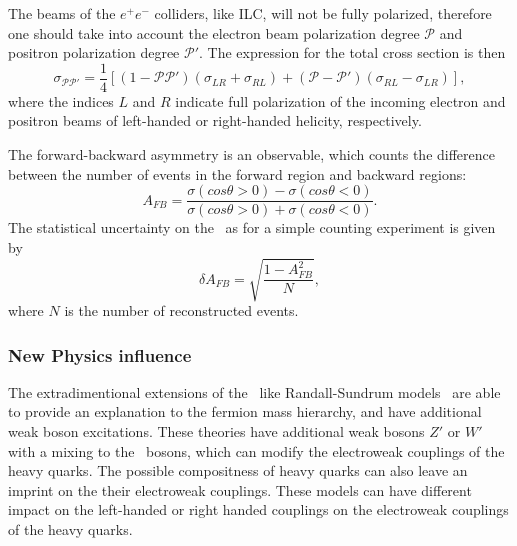The beams of the $e^+e^-$ colliders, like ILC, will not be fully polarized, therefore one should take into account the electron beam polarization degree $\mathcal{P}$ and positron polarization degree $\mathcal{P}'$. 
The expression for the total cross section is then
\begin{equation}
\label{formula:RealSigma_3}
\sigma_{\mathcal{P}\mathcal{P}'} = \frac{1}{4}[(1-\mathcal{P}\mathcal{P}')(\sigma_{LR}+\sigma_{RL} ) + (\mathcal{P} - \mathcal{P}')(\sigma_{RL} - \sigma_{LR})],
\end{equation}
where the indices $L$ and $R$ indicate full polarization of the incoming electron and positron beams of left-handed or right-handed helicity, respectively.

The forward-backward asymmetry is an observable, which counts the difference between the number of events in the forward region and backward regions:
\begin{equation}
A_{FB} = \frac{\sigma(cos\theta > 0) - \sigma(cos\theta < 0)}{\sigma(cos\theta > 0) + \sigma(cos\theta < 0)}.
\end{equation}
The statistical uncertainty on the \afb\ as for a simple counting experiment is given by 
\begin{equation}
\delta A_{FB} = \sqrt{\frac{1-A_{FB}^2}{N}},
\end{equation}
where $N$ is the number of reconstructed events. 

\subsubsection{New Physics influence}

The extradimentional extensions of the \sm\ like Randall-Sundrum models~\cite{Randall:1999ee} are able to provide an explanation to the fermion mass hierarchy, and have additional weak boson excitations. 
These theories have additional weak bosons $Z'$ or $W'$ with a mixing to the \sm\ bosons, which can modify the electroweak couplings of the heavy quarks. 
The possible compositness of heavy quarks can also leave an imprint on the their electroweak couplings.
These models can have different impact on the left-handed or right handed couplings on the electroweak couplings of the heavy quarks. 

